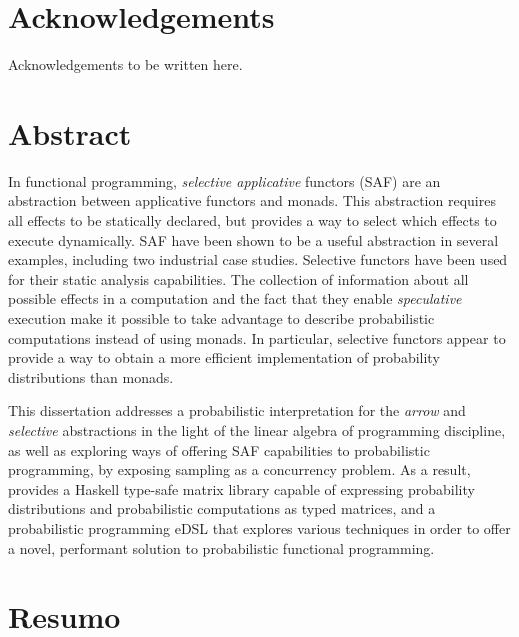 \documentclass[
  oneside,
  11pt, a4paper,
  footinclude=true,
  headinclude=true,
  cleardoublepage=empty
]{scrbook}
\author{Armando João Isaías Ferreira dos Santos}
\date{\myear} %
\theoremstyle{definition}
\theoremstyle{definition}
\begin{document}
	\umfrontcover	
	\umtitlepage
	
	\chapter*{Acknowledgements}
	Acknowledgements to be written here. %


	\chapter*{Abstract}

    In functional programming, \emph{selective applicative} functors (SAF) are an abstraction between applicative functors and monads. This abstraction requires all effects to be statically declared, but provides a way to select which effects to execute dynamically. SAF have been shown to be a useful abstraction in several examples, including two industrial case studies. Selective functors have been used for their static analysis capabilities. The collection of information about all possible effects in a computation and the fact that they enable \emph{speculative} execution make it possible to take advantage to describe probabilistic computations instead of using monads. In particular, selective functors appear to provide a way to obtain a more efficient implementation of probability distributions than monads.
    
    This dissertation addresses a probabilistic interpretation for the \emph{arrow} and \emph{selective} abstractions in the light of the linear algebra of programming discipline, as well as exploring ways of offering SAF capabilities to probabilistic programming, by exposing sampling as a concurrency problem. As a result, provides a Haskell type-safe matrix library capable of expressing probability distributions and probabilistic computations as typed matrices, and a probabilistic programming eDSL that explores various techniques in order to offer a novel, performant solution to probabilistic functional programming.
	
	\vskip0.5cm
	
	\cleardoublepage
	\chapter*{Resumo}
	
\end{document}
